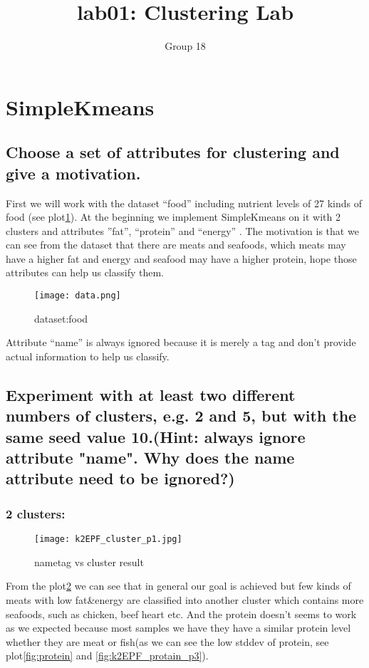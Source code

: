 \documentclass{article}
\title{lab01: Clustering Lab}
\author{Group 18}
\begin{document}
\maketitle

\section{SimpleKmeans}

\subsection{Choose a set of attributes for clustering and give a motivation.}

First we will work with the dataset “food” including nutrient levels of 27 kinds of food (see plot\ref{fig:data}).
At the beginning we implement SimpleKmeans on it with 2 clusters and attributes ”fat”, “protein” and “energy” . The motivation is that we can see from the dataset that there are meats and seafoods, which meats may have a higher fat and energy and seafood may have a higher protein, hope those attributes can help us classify them.  
\begin{figure}[H]
\centering
\texttt{[image: data.png]}
\caption{\label{fig:data}dataset:food}
\end{figure}

Attribute “name” is always ignored because it is merely a tag and don’t provide actual information to help us classify.

\subsection{Experiment with at least two different numbers of clusters, e.g. 2 and 5, but with the same seed value 10.(Hint: always ignore attribute "name". Why does the name attribute need to be ignored?)}
\subsubsection{2 clusters:}

\begin{figure}[H]
\centering
\texttt{[image: k2EPF\_cluster\_p1.jpg]}
\caption{\label{fig:k2EPF_cluster_p1}nametag vs cluster result}
\end{figure}


From the plot\ref{fig:k2EPF_cluster_p1} we can see that in general our goal is achieved but few kinds of meats with low fat\&energy are classified into another cluster which contains more seafoods, such as chicken, beef heart etc. And the protein doesn’t seems to work as we expected because most samples we have they have a similar protein level whether they are meat or fish(as we can see the low stddev of protein, see plot\ref{fig:protein} and \ref{fig:k2EPF_protain_p3}).
\end{document}

